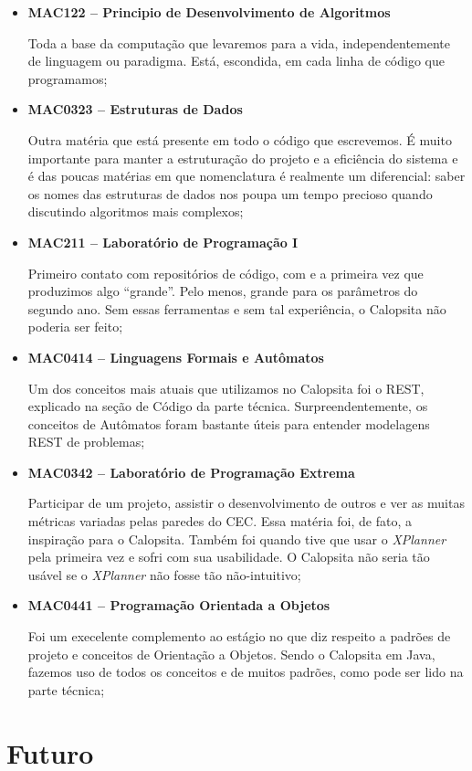 \documentclass[titlepage,a4paper]{article}
\newcommand{\calopsita}{Calopsita}
\begin{document}
\begin{itemize}
	\item{\textbf{MAC122 -- Principio de Desenvolvimento de Algoritmos}

		Toda a base da computação que levaremos para a vida, independentemente de linguagem ou paradigma. Está, escondida, em cada linha de código que programamos;}
	\item{\textbf{MAC0323 -- Estruturas de Dados} 

		Outra matéria que está presente em todo o código que escrevemos. É muito importante para manter a estruturação do projeto e a eficiência do sistema e é das poucas matérias em que nomenclatura é realmente um diferencial: saber os nomes das estruturas de dados nos poupa um tempo precioso quando discutindo algoritmos mais complexos;}
	\item{\textbf{MAC211 -- Laboratório de Programação I} 

		Primeiro contato com repositórios de código, com \latex{} e a primeira vez que produzimos algo ``grande''. Pelo menos, grande para os parâmetros do segundo ano. Sem essas ferramentas e sem tal experiência, o \calopsita{} não poderia ser feito;}
	\item{\textbf{MAC0414 -- Linguagens Formais e Autômatos} 

		Um dos conceitos mais atuais que utilizamos no \calopsita{} foi o REST, explicado na seção de Código da parte técnica. Surpreendentemente, os conceitos de Autômatos foram bastante úteis para entender modelagens REST de problemas;}
	\item{\textbf{MAC0342 -- Laboratório de Programação Extrema}

		Participar de um projeto, assistir o desenvolvimento de outros e ver as muitas métricas variadas pelas paredes do CEC. Essa matéria foi, de fato, a inspiração para o \calopsita{}. Também foi quando tive que usar o \textit{XPlanner} pela primeira vez e sofri com sua usabilidade. O \calopsita{} não seria tão usável se o \textit{XPlanner} não fosse tão não-intuitivo;}
	\item{\textbf{MAC0441 -- Programação Orientada a Objetos}

		Foi um execelente complemento ao estágio no que diz respeito a padrões de projeto e conceitos de Orientação a Objetos. Sendo o \calopsita{} em Java, fazemos uso de todos os conceitos e de muitos padrões, como pode ser lido na parte técnica;}
\end{itemize}

\section{Futuro}
\end{document}
